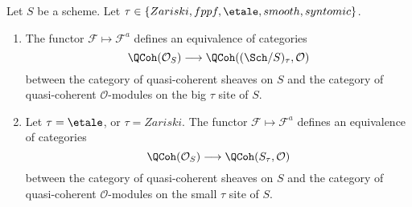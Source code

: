 \begin{proposition}
\label{proposition-equivalence-quasi-coherent}
Let $S$ be a scheme.
Let $\tau \in \{Zariski, \linebreak[0] fppf, \linebreak[0]
\etale, \linebreak[0] smooth, \linebreak[0] syntomic\}$.
\begin{enumerate}
\item The functor $\mathcal{F} \mapsto \mathcal{F}^a$
defines an equivalence of categories
$$
\QCoh(\mathcal{O}_S)
\longrightarrow
\QCoh((\Sch/S)_\tau, \mathcal{O})
$$
between the category of quasi-coherent sheaves on $S$ and the category
of quasi-coherent $\mathcal{O}$-modules on the big $\tau$ site of $S$.
\item Let $\tau = \etale$, or $\tau = Zariski$.
The functor $\mathcal{F} \mapsto \mathcal{F}^a$
defines an equivalence of categories
$$
\QCoh(\mathcal{O}_S)
\longrightarrow
\QCoh(S_\tau, \mathcal{O})
$$
between the category of quasi-coherent sheaves on $S$ and the category
of quasi-coherent $\mathcal{O}$-modules on the small $\tau$ site of $S$.
\end{enumerate}
\end{proposition}

